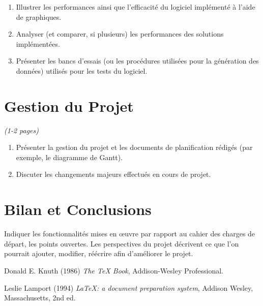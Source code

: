 \documentclass[a4paper]{article} %
\begin{document}
\begin{enumerate}%
\item 	Illustrer les performances ainsi que l'efficacité du logiciel implémenté à l'aide de graphiques.
\item Analyser (et comparer, si plusieurs) les performances des solutions implémentées.
\item	Présenter les bancs d'essais (ou les procédures utilisées pour la génération des données) utilisés pour les tests du logiciel.
\end{enumerate}

\section{Gestion du Projet}
\emph{ (1-2 pages)}
\begin{enumerate}%
\item 	Présenter la gestion du projet et les documents de planification rédigés (par exemple, le diagramme de Gantt).
\item	Discuter les changements majeurs effectués en cours de projet. 
\end{enumerate}

\section{Bilan et Conclusions}

	Indiquer les fonctionnalités mises en œuvre par rapport au cahier des charges de départ, les points ouvertes.
	Les perspectives du projet décrivent ce que l’on pourrait ajouter, modifier, réécrire afin d’améliorer le projet. 
	
\begin{thebibliography}{9}
Donald E. Knuth (1986) \emph{The \TeX{} Book}, Addison-Wesley Professional.

Leslie Lamport (1994) \emph{\LaTeX: a document preparation system}, Addison
Wesley, Massachusetts, 2nd ed.
\end{thebibliography}
\end{document}
